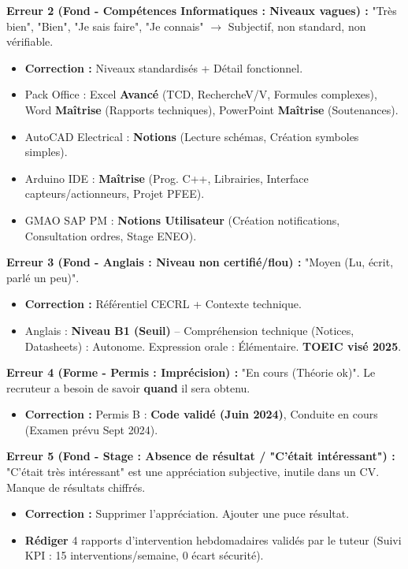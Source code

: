 \documentclass[11pt]{article}
\begin{document}
\begin{exoresolu}
\noindent \textbf{Erreur 2 (Fond - Compétences Informatiques : Niveaux vagues) :} "Très bien", "Bien", "Je sais faire", "Je connais" $\rightarrow$ Subjectif, non standard, non vérifiable.
\begin{itemize}
    \item \textbf{Correction :} Niveaux standardisés + Détail fonctionnel.
    \item \og Pack Office : Excel \textbf{Avancé} (TCD, RechercheV/V, Formules complexes), Word \textbf{Maîtrise} (Rapports techniques), PowerPoint \textbf{Maîtrise} (Soutenances). \fg
    \item \og AutoCAD Electrical : \textbf{Notions} (Lecture schémas, Création symboles simples). \fg
    \item \og Arduino IDE : \textbf{Maîtrise} (Prog. C++, Librairies, Interface capteurs/actionneurs, Projet PFEE). \fg
    \item \og GMAO SAP PM : \textbf{Notions Utilisateur} (Création notifications, Consultation ordres, Stage ENEO). \fg
\end{itemize}

\noindent \textbf{Erreur 3 (Fond - Anglais : Niveau non certifié/flou) :} "Moyen (Lu, écrit, parlé un peu)".
\begin{itemize}
    \item \textbf{Correction :} Référentiel CECRL + Contexte technique.
    \item \og Anglais : \textbf{Niveau B1 (Seuil)} -- Compréhension technique (Notices, Datasheets) : Autonome. Expression orale : Élémentaire. \textbf{TOEIC visé 2025}. \fg
\end{itemize}

\noindent \textbf{Erreur 4 (Forme - Permis : Imprécision) :} "En cours (Théorie ok)". Le recruteur a besoin de savoir \textbf{quand} il sera obtenu.
\begin{itemize}
    \item \textbf{Correction :} \og Permis B : \textbf{Code validé (Juin 2024)}, Conduite en cours (Examen prévu Sept 2024). \fg
\end{itemize}

\noindent \textbf{Erreur 5 (Fond - Stage : Absence de résultat / "C'était intéressant") :} "C'était très intéressant" est une appréciation subjective, inutile dans un CV. Manque de résultats chiffrés.
\begin{itemize}
    \item \textbf{Correction :} Supprimer l'appréciation. Ajouter une puce résultat.
    \item \og \textbf{Rédiger} 4 rapports d'intervention hebdomadaires validés par le tuteur (Suivi KPI : 15 interventions/semaine, 0 écart sécurité). \fg
\end{itemize}


\end{exoresolu}
\end{document}

